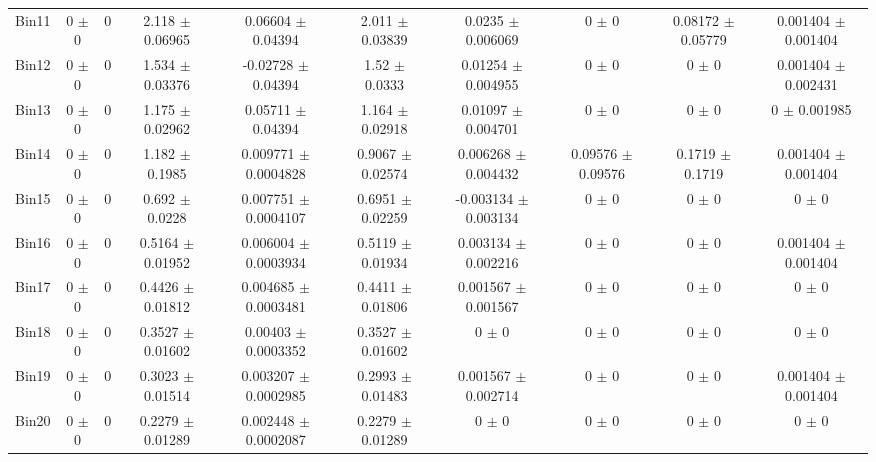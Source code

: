 \begin{tabular}{@{\extracolsep{4pt}}lccccccccc@{}}
     Bin11 & 0 $\pm$ 0 & 0 & 2.118 $\pm$ 0.06965 & 0.06604 $\pm$ 0.04394 & 2.011 $\pm$ 0.03839 & 0.0235 $\pm$ 0.006069 & 0 $\pm$ 0 & 0.08172 $\pm$ 0.05779 & 0.001404 $\pm$ 0.001404 \\ 
     Bin12 & 0 $\pm$ 0 & 0 & 1.534 $\pm$ 0.03376 & -0.02728 $\pm$ 0.04394 & 1.52 $\pm$ 0.0333 & 0.01254 $\pm$ 0.004955 & 0 $\pm$ 0 & 0 $\pm$ 0 & 0.001404 $\pm$ 0.002431 \\ 
     Bin13 & 0 $\pm$ 0 & 0 & 1.175 $\pm$ 0.02962 & 0.05711 $\pm$ 0.04394 & 1.164 $\pm$ 0.02918 & 0.01097 $\pm$ 0.004701 & 0 $\pm$ 0 & 0 $\pm$ 0 & 0 $\pm$ 0.001985 \\ 
     Bin14 & 0 $\pm$ 0 & 0 & 1.182 $\pm$ 0.1985 & 0.009771 $\pm$ 0.0004828 & 0.9067 $\pm$ 0.02574 & 0.006268 $\pm$ 0.004432 & 0.09576 $\pm$ 0.09576 & 0.1719 $\pm$ 0.1719 & 0.001404 $\pm$ 0.001404 \\ 
     Bin15 & 0 $\pm$ 0 & 0 & 0.692 $\pm$ 0.0228 & 0.007751 $\pm$ 0.0004107 & 0.6951 $\pm$ 0.02259 & -0.003134 $\pm$ 0.003134 & 0 $\pm$ 0 & 0 $\pm$ 0 & 0 $\pm$ 0 \\ 
     Bin16 & 0 $\pm$ 0 & 0 & 0.5164 $\pm$ 0.01952 & 0.006004 $\pm$ 0.0003934 & 0.5119 $\pm$ 0.01934 & 0.003134 $\pm$ 0.002216 & 0 $\pm$ 0 & 0 $\pm$ 0 & 0.001404 $\pm$ 0.001404 \\ 
     Bin17 & 0 $\pm$ 0 & 0 & 0.4426 $\pm$ 0.01812 & 0.004685 $\pm$ 0.0003481 & 0.4411 $\pm$ 0.01806 & 0.001567 $\pm$ 0.001567 & 0 $\pm$ 0 & 0 $\pm$ 0 & 0 $\pm$ 0 \\ 
     Bin18 & 0 $\pm$ 0 & 0 & 0.3527 $\pm$ 0.01602 & 0.00403 $\pm$ 0.0003352 & 0.3527 $\pm$ 0.01602 & 0 $\pm$ 0 & 0 $\pm$ 0 & 0 $\pm$ 0 & 0 $\pm$ 0 \\ 
     Bin19 & 0 $\pm$ 0 & 0 & 0.3023 $\pm$ 0.01514 & 0.003207 $\pm$ 0.0002985 & 0.2993 $\pm$ 0.01483 & 0.001567 $\pm$ 0.002714 & 0 $\pm$ 0 & 0 $\pm$ 0 & 0.001404 $\pm$ 0.001404 \\ 
     Bin20 & 0 $\pm$ 0 & 0 & 0.2279 $\pm$ 0.01289 & 0.002448 $\pm$ 0.0002087 & 0.2279 $\pm$ 0.01289 & 0 $\pm$ 0 & 0 $\pm$ 0 & 0 $\pm$ 0 & 0 $\pm$ 0 \\ 
\hline\hline
  \end{tabular}
